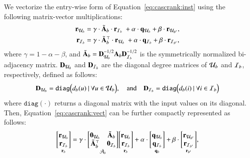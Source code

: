 We vectorize the entry-wise form of Equation~\eqref{eq:cascrank:inst} using the following matrix-vector multiplications:
\begin{align}
    \label{eq:cascrank:vect}
    \begin{split}
    \mathbf{r}_{\mathcal{U}_{b}} &= \gamma \cdot \tilde{\mathbf{A}}_{b} \cdot \mathbf{r}_{\mathcal{I}_{b}} \
    + \alpha\cdot\mathbf{q}_{\mathcal{U}_{b}} + \beta\cdot\mathbf{r}_{\mathcal{U}_{b'}}, \\
    \mathbf{r}_{\mathcal{I}_{b}} &= \gamma \cdot
        \tilde{\mathbf{A}}_{b}^{\top} \cdot \mathbf{r}_{\mathcal{U}_{b}} \
     + \alpha\cdot\mathbf{q}_{\mathcal{I}_{b}} + \beta\cdot\mathbf{r}_{\mathcal{I}_{b'}},
    \end{split}
\end{align}
where $\gamma = 1 - \alpha - \beta$, and
$\tilde{\mathbf{A}}_{b} = \mathbf{D}_{\mathcal{U}_{b}}^{-1/2} \mathbf{A}_{b} \mathbf{D}_{\mathcal{I}_{b}}^{-1/2}$ is the symmetrically normalized bi-adjacency matrix. 
$\mathbf{D}_{\mathcal{U}_{b}}$ and $\mathbf{D}_{\mathcal{I}_{b}}$ are the diagonal degree matrices of $\mathcal{U}_{b}$ and $\mathcal{I}_{b}$, respectively, defined as follows:
\begin{equation*}
    \mathbf{D}_{\mathcal{U}_{b}} = \texttt{diag}\Big(d_{b}(u) \: | \: \forall u \in \mathcal{U}_{b} \Big), \quad \text{and} \quad 
    \mathbf{D}_{\mathcal{I}_{b}} = \texttt{diag}\Big(d_{b}(i) \: | \: \forall i \in \mathcal{I}_{b} \Big)
\end{equation*}
where $\texttt{diag}(\cdot)$ returns a diagonal matrix with the input values on its diagonal.
Then, Equation~\eqref{eq:cascrank:vect} can be further compactly represented as follows:
\begin{align}
    \label{eq:cascrank:mat}
    \underset{\mathbf{r}_{b}}
    {\begin{bmatrix}
        \mathbf{r}_{\mathcal{U}_{b}}\\\mathbf{r}_{\mathcal{I}_{b}}
    \end{bmatrix}}=
    \gamma \cdot 
    \underset{\tilde{\mathbf{\mathcal{A}}}_b}{\begin{bmatrix}
        \mathbf{0}_{\mathcal{U}_{b}} & \tilde{\mathbf{A}}_{b} \\
        \tilde{\mathbf{A}}_{b}^{\top} & \mathbf{0}_{\mathcal{I}_{b}}
    \end{bmatrix}}
    \underset{\mathbf{r}_{b}}
    {\begin{bmatrix}
        \mathbf{r}_{\mathcal{U}_{b}}\\\mathbf{r}_{\mathcal{I}_{b}}
    \end{bmatrix}}+
    \alpha \cdot
    \underset{\mathbf{q}_{b}}
    {\begin{bmatrix}
        \mathbf{q}_{\mathcal{U}_{b}}\\\mathbf{q}_{\mathcal{I}_{b}}
    \end{bmatrix}}+
    \beta\cdot
    \underset{\mathbf{r}_{b'}}
    {\begin{bmatrix}
        \mathbf{r}_{\mathcal{U}_{b'}} \\ \mathbf{r}_{\mathcal{I}_{b'}}
    \end{bmatrix}},
\end{align}
